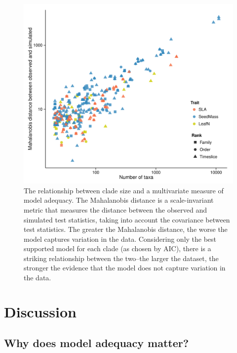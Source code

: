 \begin{figure}[p]
  \centering
  \includegraphics[width=\textwidth]{figs/ad-size-ml}
  \caption[Model adequacy vs. clade size (ML)]{The relationship between clade size and a multivariate measure of model adequacy. The Mahalanobis distance is a scale-invariant metric that measures the distance between the observed and simulated test statistics, taking into account the covariance between test statistics. The greater the Mahalanobis distance, the worse the model captures variation in the data. Considering only the best supported model for each clade (as chosen by AIC), there is a striking relationship between the two--the larger the dataset, the stronger the evidence that the model does not capture variation in the data.}
  \label{fig:size-adequacy}
\end{figure}

\section{Discussion}

\subsection{Why does model adequacy matter?}

